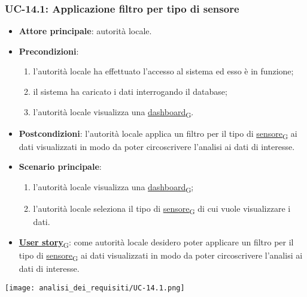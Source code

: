 \subsubsection{UC-14.1: Applicazione filtro per tipo di sensore}
\begin{itemize}
	\item \textbf{Attore principale}: autorità locale.
	\item \textbf{Precondizioni}:
	      \begin{enumerate}
		      \item l'autorità locale ha effettuato l'accesso al sistema ed esso è in funzione;
		      \item il sistema ha caricato i dati interrogando il database;
		      \item l'autorità locale visualizza una \href{https://7last.github.io/docs/pb/documentazione-interna/glossario\#dashboard}{dashboard\textsubscript{G}}.
	      \end{enumerate}
	\item \textbf{Postcondizioni}: l'autorità locale applica un filtro per il tipo di \href{https://7last.github.io/docs/pb/documentazione-interna/glossario\#sensore}{sensore\textsubscript{G}} ai dati visualizzati in modo da poter circoscrivere l'analisi ai dati di interesse.
	\item \textbf{Scenario principale}:
	      \begin{enumerate}
		      \item l'autorità locale visualizza una \href{https://7last.github.io/docs/pb/documentazione-interna/glossario\#dashboard}{dashboard\textsubscript{G}};
		      \item l'autorità locale seleziona il tipo di \href{https://7last.github.io/docs/pb/documentazione-interna/glossario\#sensore}{sensore\textsubscript{G}} di cui vuole visualizzare i dati.
	      \end{enumerate}
	\item \href{https://7last.github.io/docs/pb/documentazione-interna/glossario\#user-story}{\textbf{User story}\textsubscript{G}}:
	      come autorità locale desidero poter applicare un filtro per il tipo di \href{https://7last.github.io/docs/pb/documentazione-interna/glossario\#sensore}{sensore\textsubscript{G}} ai dati visualizzati in modo da poter circoscrivere l'analisi ai dati di interesse.
\end{itemize}
\begin{center}
	\texttt{[image: analisi\_dei\_requisiti/UC-14.1.png]}
\end{center}

